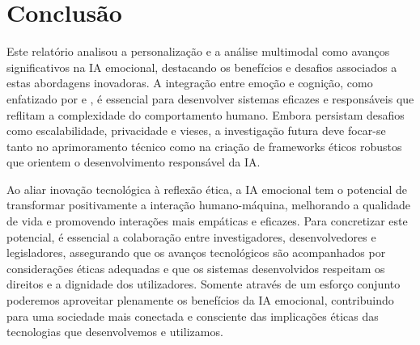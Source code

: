 \documentclass[a4paper,12pt]{report}
\begin{document}
	\section{Conclusão}
	
	Este relatório analisou a personalização e a análise multimodal como avanços significativos na IA emocional, destacando os benefícios e desafios associados a estas abordagens inovadoras. A integração entre emoção e cognição, como enfatizado por \textcite{picard1997} e \textcite{haidt2001}, é essencial para desenvolver sistemas eficazes e responsáveis que reflitam a complexidade do comportamento humano. Embora persistam desafios como escalabilidade, privacidade e vieses, a investigação futura deve focar-se tanto no aprimoramento técnico como na criação de frameworks éticos robustos que orientem o desenvolvimento responsável da IA.
	
	Ao aliar inovação tecnológica à reflexão ética, a IA emocional tem o potencial de transformar positivamente a interação humano-máquina, melhorando a qualidade de vida e promovendo interações mais empáticas e eficazes. Para concretizar este potencial, é essencial a colaboração entre investigadores, desenvolvedores e legisladores, assegurando que os avanços tecnológicos são acompanhados por considerações éticas adequadas e que os sistemas desenvolvidos respeitam os direitos e a dignidade dos utilizadores. Somente através de um esforço conjunto poderemos aproveitar plenamente os benefícios da IA emocional, contribuindo para uma sociedade mais conectada e consciente das implicações éticas das tecnologias que desenvolvemos e utilizamos.

	\newpage
	
	\printbibliography
\end{document}
